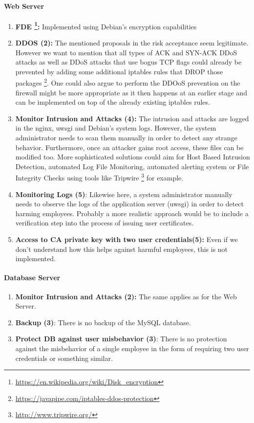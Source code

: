 \documentclass[english]{article}
\begin{document}
\paragraph{Web Server}
\begin{enumerate}[label=(\alph*)] 
\item \textbf{FDE \footnote{\url{https://en.wikipedia.org/wiki/Disk_encryption}}:} Implemented using Debian's encryption capabilities 
\item \textbf{DDOS (2):} The mentioned proposals in the risk acceptance seem legitimate. However we want to mention that all types of ACK and SYN-ACK DDoS attacks as well as DDoS attacks that use bogus TCP flags could already be prevented by adding some additional iptables rules that DROP those packages \footnote{\url{https://javapipe.com/iptables-ddos-protection}}. One could also argue to perform the DDOoS prevention on the firewall might be more appropriate as it then happens at an earlier stage and can be implemented on top of the already existing iptables rules.
\item \textbf{Monitor Intrusion and Attacks (4):} The intrusion and attacks are logged in the nginx, uwsgi and Debian's system logs. However, the system administrator needs to scan them manually in order to detect any strange behavior. Furthermore, once an attacker gains root access, these files can be modified too. More sophisticated solutions could aim for Host Based Intrusion Detection, automated Log File Monitoring, automated alerting system or File Integrity Checks using tools like Tripwire \footnote{\url{http://www.tripwire.org/}} for example.
\item \textbf{Monitoring Logs (5)}: Likewise here, a system administrator manually needs to observe the logs of the application server (uwsgi) in order to detect harming employees. Probably a more realistic approach would be to include a verification step into the process of issuing user certificates.
\item \textbf{Access to CA private key with two user credentials(5):} Even if we don't understand how this helps against harmful employees, this is not implemented.
\end{enumerate} 

\paragraph{Database Server}
\begin{enumerate}[label=(\alph*)]
	\item \textbf{Monitor Intrusion and Attacks (2):} The same applies as for the Web Server.
	\item \textbf{Backup (3)}: There is no backup of the MySQL database.
	\item \textbf{Protect DB against user misbehavior (3)}: There is no protection against the misbehavior of a single employee in the form of requiring two user credentials or something similar.
\end{enumerate} 
\end{document}
